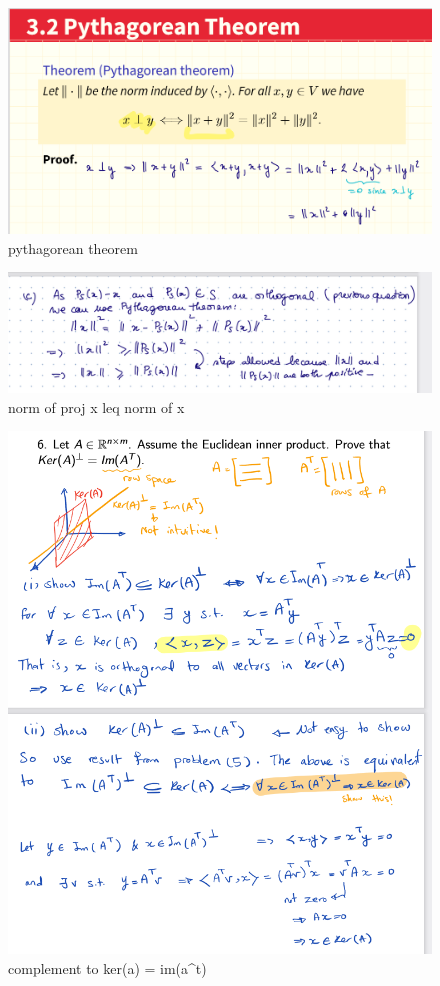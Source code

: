 \documentclass[12pt,twoside]{article}
\begin{document}
\begin{figure}[h]
    \centering
    \includegraphics[scale=.45]{screenshots/pythagorean theorem.png}
    \caption{pythagorean theorem}
    \label{fig:my_label}
\end{figure}
\begin{figure}[h]
    \centering
    \includegraphics[scale=.45]{screenshots/norm of proj x leq norm of x.png}
    \caption{norm of proj x leq norm of x}
    \label{fig:my_label}
\end{figure}
\begin{figure}[h]
    \centering
    \includegraphics[scale=.7]{screenshots/complement to ker(a) = im(a^t).png}
    \caption{complement to ker(a) = im(a^t)}
    \label{fig:my_label}
\end{figure}
\end{document}
